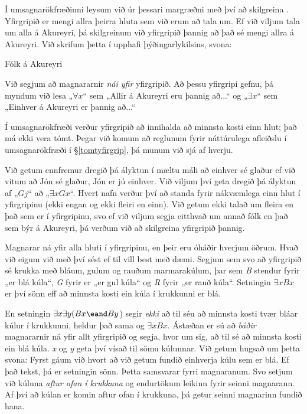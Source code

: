 Í umsagnarökfræðinni leysum við úr þessari margræðni með því að skilgreina . Yfirgripið er mengi allra þeirra hluta sem við erum að tala um. Ef við viljum tala um alla á Akureyri, þá skilgreinum við yfirgripið þannig að það sé mengi allra á Akureyri. Við skrifum þetta í upphafi þýðingarlykilsins, svona:
	\begin{ekey}
		\item[\text{yfirgrip}] Fólk á Akureyri
	\end{ekey}
Við segjum að magnararnir \emph{nái yfir} yfirgripið. Að þessu yfirgripi gefnu, þá myndum við lesa „$\forall x$“ sem „Allir á Akureyri eru þannig að...“ og „$\exists x$“ sem „Einhver á Akureyri er þannig að...“
	
Í umsagnarökfræði verður yfirgripið að innihalda að minnsta kosti einn hlut; það má ekki vera tómt. Þegar við komum að reglunum fyrir náttúrulega afleiðslu í umsagnarökfræði í \S\ref{tomtyfirgrip}, þá munum við sjá af hverju.

Við getum ennfremur dregið þá ályktun í mæltu máli að einhver sé glaður ef við vitum að Jón sé glaður, Jón er jú einhver. Við viljum því geta dregið þá ályktun af „$Gj$“ að „$\exists x Gx$“. Hvert nafn verður því að standa fyrir nákvæmlega einn hlut í yfirgripinu (ekki engan og ekki fleiri en einn). Við getum ekki talað um fleira en það sem er í yfirgripinu, svo ef við viljum segja eitthvað um annað fólk en það sem býr á Akureyri, þá verðum við að skilgreina yfirgripið þannig.

Magnarar ná yfir alla hluti í yfirgripinu, en þeir eru óháðir hverjum öðrum. Hvað við eigum við með því sést ef til vill best með dæmi. Segjum sem svo að yfirgripið sé krukka með bláum, gulum og rauðum marmarakúlum, þar sem \emph{B} stendur fyrir „\blank er blá kúla“, \emph{G} fyrir er „\blank er gul kúla“ og \emph{R} fyrir „\blank er rauð kúla“. Setningin $\exists x Bx$ er því sönn eff að minnsta kosti ein kúla í krukkunni er blá.

En setningin $\exists x \exists y (Bx \eand By$) segir \emph{ekki} að til séu að minnsta kosti tvær bláar kúlur í krukkunni, heldur það sama og $\exists x Bx$. Ástæðan er sú að \emph{báðir} magnararnir ná yfir allt yfirgripið og segja, hvor um sig, að til sé að minnsta kosti ein blá kúla. \emph{x} og \emph{y} geta því vísað til sömu kúlunnar. Við getum hugsað um þetta svona: Fyrst gáum við hvort að við getum fundið einhverja kúlu sem er blá. Ef það tekst, þá er setningin sönn. Þetta samsvarar fyrri magnaranum. Svo setjum við kúluna \emph{aftur ofan í krukkuna} og endurtökum leikinn fyrir seinni magnarann. Af því að kúlan er komin aftur ofan í krukkuna, þá getur seinni magnarinn fundið hana.

